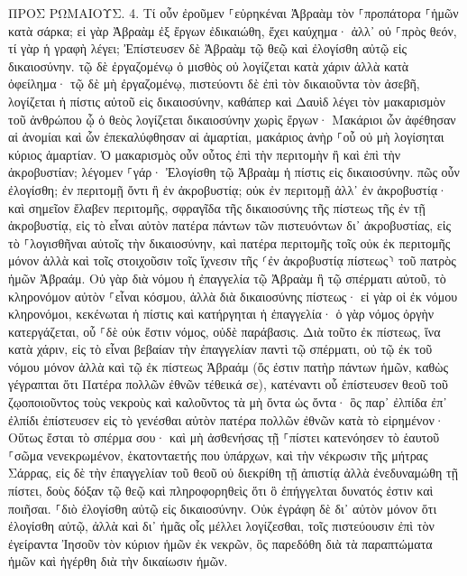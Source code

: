 \documentclass[twoside, 9pt]{extreport}
\begin{document}
ΠΡΟΣ ΡΩΜΑΙΟΥΣ.
4.
Τί οὖν ἐροῦμεν ⸀εὑρηκέναι Ἀβραὰμ τὸν ⸀προπάτορα ⸀ἡμῶν κατὰ σάρκα; 
εἰ γὰρ Ἀβραὰμ ἐξ ἔργων ἐδικαιώθη, ἔχει καύχημα· ἀλλ᾽ οὐ ⸀πρὸς θεόν, 
τί γὰρ ἡ γραφὴ λέγει; Ἐπίστευσεν δὲ Ἀβραὰμ τῷ θεῷ καὶ ἐλογίσθη αὐτῷ εἰς δικαιοσύνην. 
τῷ δὲ ἐργαζομένῳ ὁ μισθὸς οὐ λογίζεται κατὰ χάριν ἀλλὰ κατὰ ὀφείλημα· 
τῷ δὲ μὴ ἐργαζομένῳ, πιστεύοντι δὲ ἐπὶ τὸν δικαιοῦντα τὸν ἀσεβῆ, λογίζεται ἡ πίστις αὐτοῦ εἰς δικαιοσύνην, 
καθάπερ καὶ Δαυὶδ λέγει τὸν μακαρισμὸν τοῦ ἀνθρώπου ᾧ ὁ θεὸς λογίζεται δικαιοσύνην χωρὶς ἔργων· 
Μακάριοι ὧν ἀφέθησαν αἱ ἀνομίαι καὶ ὧν ἐπεκαλύφθησαν αἱ ἁμαρτίαι, 
μακάριος ἀνὴρ ⸀οὗ οὐ μὴ λογίσηται κύριος ἁμαρτίαν. 
Ὁ μακαρισμὸς οὖν οὗτος ἐπὶ τὴν περιτομὴν ἢ καὶ ἐπὶ τὴν ἀκροβυστίαν; λέγομεν ⸀γάρ· Ἐλογίσθη τῷ Ἀβραὰμ ἡ πίστις εἰς δικαιοσύνην. 
πῶς οὖν ἐλογίσθη; ἐν περιτομῇ ὄντι ἢ ἐν ἀκροβυστίᾳ; οὐκ ἐν περιτομῇ ἀλλ᾽ ἐν ἀκροβυστίᾳ· 
καὶ σημεῖον ἔλαβεν περιτομῆς, σφραγῖδα τῆς δικαιοσύνης τῆς πίστεως τῆς ἐν τῇ ἀκροβυστίᾳ, εἰς τὸ εἶναι αὐτὸν πατέρα πάντων τῶν πιστευόντων δι᾽ ἀκροβυστίας, εἰς τὸ ⸀λογισθῆναι αὐτοῖς τὴν δικαιοσύνην, 
καὶ πατέρα περιτομῆς τοῖς οὐκ ἐκ περιτομῆς μόνον ἀλλὰ καὶ τοῖς στοιχοῦσιν τοῖς ἴχνεσιν τῆς ⸂ἐν ἀκροβυστίᾳ πίστεως⸃ τοῦ πατρὸς ἡμῶν Ἀβραάμ. 
Οὐ γὰρ διὰ νόμου ἡ ἐπαγγελία τῷ Ἀβραὰμ ἢ τῷ σπέρματι αὐτοῦ, τὸ κληρονόμον αὐτὸν ⸀εἶναι κόσμου, ἀλλὰ διὰ δικαιοσύνης πίστεως· 
εἰ γὰρ οἱ ἐκ νόμου κληρονόμοι, κεκένωται ἡ πίστις καὶ κατήργηται ἡ ἐπαγγελία· 
ὁ γὰρ νόμος ὀργὴν κατεργάζεται, οὗ ⸀δὲ οὐκ ἔστιν νόμος, οὐδὲ παράβασις. 
Διὰ τοῦτο ἐκ πίστεως, ἵνα κατὰ χάριν, εἰς τὸ εἶναι βεβαίαν τὴν ἐπαγγελίαν παντὶ τῷ σπέρματι, οὐ τῷ ἐκ τοῦ νόμου μόνον ἀλλὰ καὶ τῷ ἐκ πίστεως Ἀβραάμ (ὅς ἐστιν πατὴρ πάντων ἡμῶν, 
καθὼς γέγραπται ὅτι Πατέρα πολλῶν ἐθνῶν τέθεικά σε), κατέναντι οὗ ἐπίστευσεν θεοῦ τοῦ ζῳοποιοῦντος τοὺς νεκροὺς καὶ καλοῦντος τὰ μὴ ὄντα ὡς ὄντα· 
ὃς παρ᾽ ἐλπίδα ἐπ᾽ ἐλπίδι ἐπίστευσεν εἰς τὸ γενέσθαι αὐτὸν πατέρα πολλῶν ἐθνῶν κατὰ τὸ εἰρημένον· Οὕτως ἔσται τὸ σπέρμα σου· 
καὶ μὴ ἀσθενήσας τῇ ⸀πίστει κατενόησεν τὸ ἑαυτοῦ ⸀σῶμα νενεκρωμένον, ἑκατονταετής που ὑπάρχων, καὶ τὴν νέκρωσιν τῆς μήτρας Σάρρας, 
εἰς δὲ τὴν ἐπαγγελίαν τοῦ θεοῦ οὐ διεκρίθη τῇ ἀπιστίᾳ ἀλλὰ ἐνεδυναμώθη τῇ πίστει, δοὺς δόξαν τῷ θεῷ 
καὶ πληροφορηθεὶς ὅτι ὃ ἐπήγγελται δυνατός ἐστιν καὶ ποιῆσαι. 
⸀διὸ ἐλογίσθη αὐτῷ εἰς δικαιοσύνην. 
Οὐκ ἐγράφη δὲ δι᾽ αὐτὸν μόνον ὅτι ἐλογίσθη αὐτῷ, 
ἀλλὰ καὶ δι᾽ ἡμᾶς οἷς μέλλει λογίζεσθαι, τοῖς πιστεύουσιν ἐπὶ τὸν ἐγείραντα Ἰησοῦν τὸν κύριον ἡμῶν ἐκ νεκρῶν, 
ὃς παρεδόθη διὰ τὰ παραπτώματα ἡμῶν καὶ ἠγέρθη διὰ τὴν δικαίωσιν ἡμῶν. 
\end{document}
